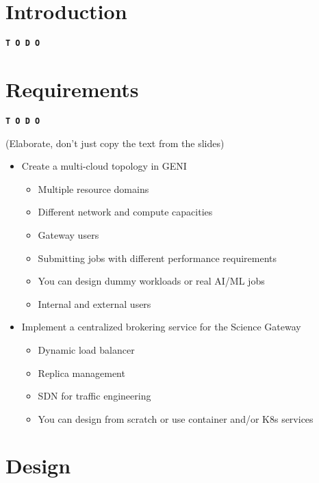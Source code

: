 \documentclass{ReportCUNY}
\begin{document}
\setlength{\belowdisplayskip}{0pt} \setlength{\belowdisplayshortskip}{1pt}
\setlength{\abovedisplayskip}{0pt} \setlength{\abovedisplayshortskip}{1pt}
\setlength{\abovedisplayskip}{5pt}
\setlength{\belowdisplayskip}{5pt}

\section{Introduction}

\begin{center}\textbf{\texttt{T~O~D~O}}\end{center}


\section{Requirements}

\begin{center}\textbf{\texttt{T~O~D~O}}\end{center}
(Elaborate, don't just copy the text from the slides)

\begin{itemize}
	\item Create a multi-cloud topology in GENI
	\begin{itemize}
		\item Multiple resource domains
		\item Different network and compute capacities
		\item Gateway users
		\item Submitting jobs with different performance requirements
		\item You can design dummy workloads or real AI/ML jobs
		\item Internal and external users
	\end{itemize}
	
	\item Implement a centralized brokering service for the Science Gateway
	\begin{itemize}
		\item Dynamic load balancer
		\item Replica management
		\item SDN for traffic engineering
		\item You can design from scratch or use container and/or K8s services
	\end{itemize}
	
\end{itemize}

\section{Design}
\end{document}
